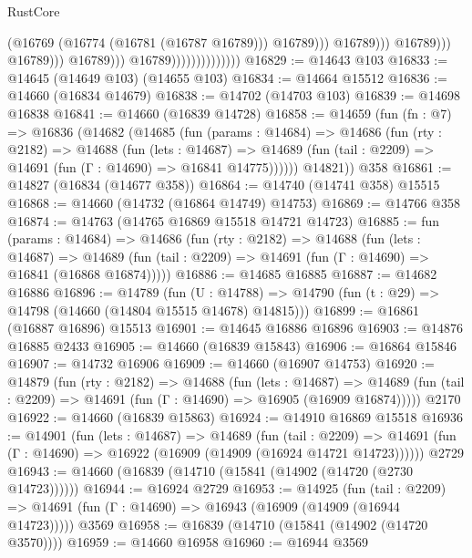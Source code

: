 \begin{lexlean}{RustCore}
\begin{coremodule}
                                                            (@16769
                                                              (@16774 (@16781 (@16787 @16789)))
                                                              @16789)))
                                                        @16789)))
                                                  @16789)))
                                            @16789)))
                                      @16789)))
                                @16789))))))))))))))
@16829 := @14643 @103
@16833 := @14645 (@14649 @103) (@14655 @103)
@16834 := @14664 @15512
@16836 := @14660 (@16834 @14679)
@16838 := @14702 (@14703 @103)
@16839 := @14698 @16838
@16841 := @14660 (@16839 @14728)
@16858 := @14659
    (fun (fn : @7) =>
    @16836
      (@14682
        (@14685
          (fun (params : @14684) =>
          @14686
            (fun (rty : @2182) =>
            @14688
              (fun (lets : @14687) =>
              @14689 (fun (tail : @2209) => @14691 (fun (Γ : @14690) => @16841 @14775))))))
        @14821))
    @358
@16861 := @14827 (@16834 (@14677 @358))
@16864 := @14740 (@14741 @358) @15515
@16868 := @14660 (@14732 (@16864 @14749) @14753)
@16869 := @14766 @358
@16874 := @14763 (@14765 @16869 @15518 @14721 @14723)
@16885 := fun (params : @14684) =>
  @14686
    (fun (rty : @2182) =>
    @14688
      (fun (lets : @14687) =>
      @14689 (fun (tail : @2209) => @14691 (fun (Γ : @14690) => @16841 (@16868 @16874)))))
@16886 := @14685 @16885
@16887 := @14682 @16886
@16896 := @14789
    (fun (U : @14788) => @14790 (fun (t : @29) => @14798 (@14660 (@14804 @15515 @14678) @14815)))
@16899 := @16861 (@16887 @16896) @15513
@16901 := @14645 @16886 @16896
@16903 := @14876 @16885 @2433
@16905 := @14660 (@16839 @15843)
@16906 := @16864 @15846
@16907 := @14732 @16906
@16909 := @14660 (@16907 @14753)
@16920 := @14879
    (fun (rty : @2182) =>
    @14688
      (fun (lets : @14687) =>
      @14689 (fun (tail : @2209) => @14691 (fun (Γ : @14690) => @16905 (@16909 @16874)))))
    @2170
@16922 := @14660 (@16839 @15863)
@16924 := @14910 @16869 @15518
@16936 := @14901
    (fun (lets : @14687) =>
    @14689
      (fun (tail : @2209) =>
      @14691 (fun (Γ : @14690) => @16922 (@16909 (@14909 (@16924 @14721 @14723))))))
    @2729
@16943 := @14660 (@16839 (@14710 (@15841 (@14902 (@14720 (@2730 @14723))))))
@16944 := @16924 @2729
@16953 := @14925
    (fun (tail : @2209) => @14691 (fun (Γ : @14690) => @16943 (@16909 (@14909 (@16944 @14723)))))
    @3569
@16958 := @16839 (@14710 (@15841 (@14902 (@14720 @3570))))
@16959 := @14660 @16958
@16960 := @16944 @3569

\end{coremodule}
\end{lexlean}
